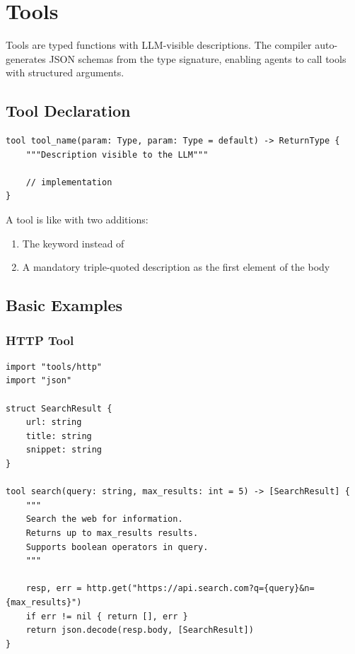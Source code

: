 \chapter{Tools}
\label{ch:tools}

Tools are typed functions with LLM-visible descriptions. The compiler auto-generates JSON schemas from the type signature, enabling agents to call tools with structured arguments.

\section{Tool Declaration}

\begin{lstlisting}
tool tool_name(param: Type, param: Type = default) -> ReturnType {
    """Description visible to the LLM"""

    // implementation
}
\end{lstlisting}

A tool is like  with two additions:
\begin{enumerate}
    \item The  keyword instead of 
    \item A mandatory triple-quoted description as the first element of the body
\end{enumerate}

\section{Basic Examples}

\subsection{HTTP Tool}

\begin{lstlisting}
import "tools/http"
import "json"

struct SearchResult {
    url: string
    title: string
    snippet: string
}

tool search(query: string, max_results: int = 5) -> [SearchResult] {
    """
    Search the web for information.
    Returns up to max_results results.
    Supports boolean operators in query.
    """

    resp, err = http.get("https://api.search.com?q={query}&n={max_results}")
    if err != nil { return [], err }
    return json.decode(resp.body, [SearchResult])
}
\end{lstlisting}


